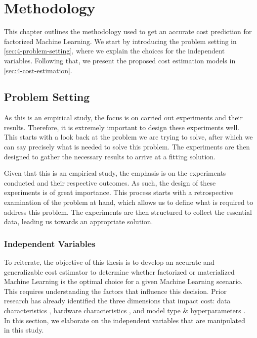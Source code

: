 
\chapter{Methodology}

\label{chapter:methodology}

This chapter outlines the methodology used to get an accurate cost prediction for factorized Machine Learning. We start by introducing the problem setting in \autoref{sec:4-problem-setting}, where we explain the choices for the independent variables. Following that, we present the proposed cost estimation models in \autoref{sec:4-cost-estimation}.

\section{Problem Setting}
\label{sec:4-problem-setting}

As this is an empirical study, the focus is on carried out experiments and their results. Therefore, it is extremely important to design these experiments well. This starts with a look back at the problem we are trying to solve, after which we can say precisely what is needed to solve this problem. The experiments are then designed to gather the necessary results to arrive at a fitting solution.

Given that this is an empirical study, the emphasis is on the experiments conducted and their respective outcomes. As such, the design of these experiments is of great importance. This process starts with a retrospective examination of the problem at hand, which allows us to define what is required to address this problem. The experiments are then structured to collect the essential data, leading us towards an appropriate solution.

\subsection{Independent Variables}
To reiterate, the objective of this thesis is to develop an accurate and generalizable cost estimator to determine whether factorized or materialized Machine Learning is the optimal choice for a given Machine Learning scenario. This requires understanding the factors that influence this decision. Prior research has already identified the three dimensions that impact cost: data characteristics \cite{morpheus, amalur,schijndel_cost_estimation}, hardware characteristics \cite{orion_learning_gen_lin_models}, and model type \& hyperparameters \cite{amalur,schijndel_cost_estimation}. In this section, we elaborate on the independent variables that are manipulated in this study.

